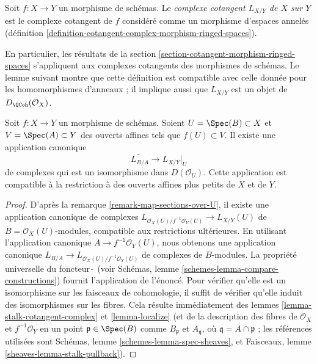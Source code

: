 \begin{definition}
\label{definition-cotangent-morphism-schemes}
Soit $f : X \to Y$ un morphisme de schémas. Le {\it complexe cotangent
$L_{X/Y}$ de $X$ sur $Y$} est le complexe cotangent de $f$ considéré comme un
morphisme d'espaces annelés (définition
\ref{definition-cotangent-complex-morphism-ringed-spaces}).
\end{definition}

\noindent
En particulier, les résultats de la section
\ref{section-cotangent-morphism-ringed-spaces} s'appliquent aux complexes
cotangents des morphismes de schémas. Le lemme suivant montre que cette
définition est compatible avec celle donnée pour les homomorphismes d'anneaux ;
il implique aussi que $L_{X/Y}$ est un objet de $D_\QCoh(\mathcal{O}_X)$.

\begin{lemma}
\label{lemma-morphism-affine-schemes}
Soit $f : X \to Y$ un morphisme de schémas. Soient
$U = \Spec(B) \subset X$ et $V = \Spec(A) \subset Y$ des ouverts affines tels
que $f(U) \subset V$. Il existe une application canonique
$$
\widetilde{L_{B/A}} \longrightarrow L_{X/Y}|_U
$$
de complexes qui est un isomorphisme dans $D(\mathcal{O}_U)$. Cette application
est compatible à la restriction à des ouverts affines plus petits de $X$ et
de $Y$.
\end{lemma}

\begin{proof}
D'après la remarque \ref{remark-map-sections-over-U}, il existe une
application canonique de complexes
$L_{\mathcal{O}_X(U)/f^{-1}\mathcal{O}_Y(U)} \to L_{X/Y}(U)$
de $B = \mathcal{O}_X(U)$-modules, compatible aux restrictions ultérieures. En
utilisant l'application canonique $A \to f^{-1}\mathcal{O}_Y(U)$, nous
obtenons une application canonique
$L_{B/A} \to L_{\mathcal{O}_X(U)/f^{-1}\mathcal{O}_Y(U)}$
de complexes de $B$-modules. La propriété universelle du foncteur
$\widetilde{\ }$ (voir Schémas, lemme
\ref{schemes-lemma-compare-constructions}) fournit l'application de l'énoncé.
Pour vérifier qu'elle est un isomorphisme sur les faisceaux de cohomologie, il
suffit de vérifier qu'elle induit des isomorphismes sur les fibres. Cela
résulte immédiatement des lemmes \ref{lemma-stalk-cotangent-complex} et
\ref{lemma-localize} (et de la description des fibres de
$\mathcal{O}_X$ et $f^{-1}\mathcal{O}_Y$
en un point $\mathfrak p \in \Spec(B)$ comme $B_\mathfrak p$ et
$A_\mathfrak q$, où $\mathfrak q = A \cap \mathfrak p$ ; les références
utilisées sont Schémas, lemme \ref{schemes-lemma-spec-sheaves}, et Faisceaux,
lemme \ref{sheaves-lemma-stalk-pullback}).
\end{proof}

